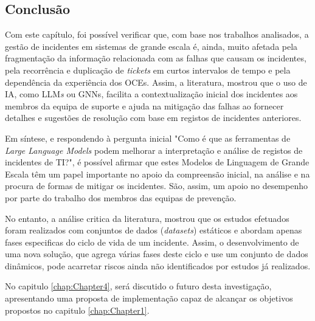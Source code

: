 	
	\subsection{Conclusão}
	
		Com este capítulo, foi possível verificar que, com base nos trabalhos analisados, a gestão de incidentes em sistemas de grande escala é, ainda, muito afetada pela fragmentação da informação relacionada com as falhas que causam os incidentes, pela recorrência e duplicação de \textit{tickets} em curtos intervalos de tempo e pela dependência da experiência dos \gls{OCEs}. Assim, a literatura, mostrou que o uso de \gls{IA}, como \gls{LLM}\textit{s} ou \gls{GNNs}, facilita a contextualização inicial dos incidentes aos membros da equipa de suporte e ajuda na mitigação das falhas ao fornecer detalhes e sugestões de resolução com base em registos de incidentes anteriores.
		
		Em síntese, e respondendo à pergunta inicial "Como é que as ferramentas de \textit{Large Language Models} podem melhorar a interpretação e análise de registos de incidentes de TI?", é possível afirmar que estes Modelos de Linguagem de Grande Escala têm um papel importante no apoio da compreensão inicial, na análise e na procura de formas de mitigar os incidentes. São, assim, um apoio no desempenho por parte do trabalho dos membros das equipas de prevenção.
		
		No entanto, a análise critica da literatura, mostrou que os estudos efetuados foram realizados com conjuntos de dados (\textit{datasets}) estáticos e abordam apenas fases especificas do ciclo de vida de um incidente. Assim, o desenvolvimento de uma nova solução, que agrega várias fases deste ciclo e use um conjunto de dados dinâmicos, pode acarretar riscos ainda não identificados por estudos já realizados.
		
		No capitulo \ref{chap:Chapter4}, será discutido o futuro desta investigação, apresentando uma proposta de implementação capaz de alcançar os objetivos propostos no capitulo \ref{chap:Chapter1}.
		
%	

